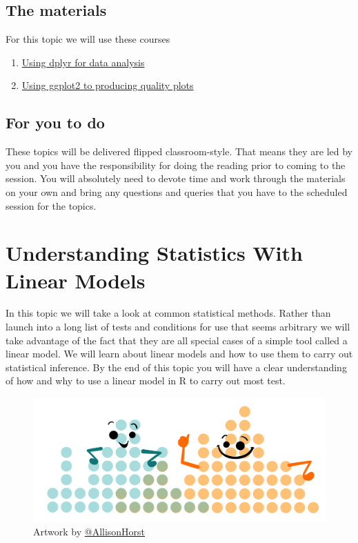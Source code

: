 \documentclass[
]{book}
\providecommand{\tightlist}{%
  \setlength{\itemsep}{0pt}\setlength{\parskip}{0pt}}
\begin{document}
\hypertarget{the-materials-1}{%
\section{The materials}\label{the-materials-1}}

For this topic we will use these courses

\begin{enumerate}
\def\labelenumi{\arabic{enumi}.}
\tightlist
\item
  \href{https://danmaclean.github.io/tidyversebook/index.html}{Using dplyr for data analysis}
\item
  \href{https://danmaclean.github.io/ggplotbook/index.html}{Using ggplot2 to producing quality plots}
\end{enumerate}

\hypertarget{for-you-to-do-1}{%
\section{For you to do}\label{for-you-to-do-1}}

These topics will be delivered flipped classroom-style. That means they are led by you and you have the responsibility for doing the reading prior to coming to the session. You will absolutely need to devote time and work through the materials on your own and bring any questions and queries that you have to the scheduled session for the topics.

\hypertarget{understanding-statistics-with-linear-models}{%
\chapter{Understanding Statistics With Linear Models}\label{understanding-statistics-with-linear-models}}

In this topic we will take a look at common statistical methods. Rather than launch into a long list of tests and conditions for use that seems arbitrary we will take advantage of the fact that they are all special cases of a simple tool called a linear model. We will learn about linear models and how to use them to carry out statistical inference. By the end of this topic you will have a clear understanding of how and why to use a linear model in R to carry out most test.

\begin{figure}
\centering
\includegraphics{ex_4.png}
\caption{\label{fig:unnamed-chunk-6}Artwork by \href{https://github.com/allisonhorst}{@AllisonHorst}}
\end{figure}
\end{document}
